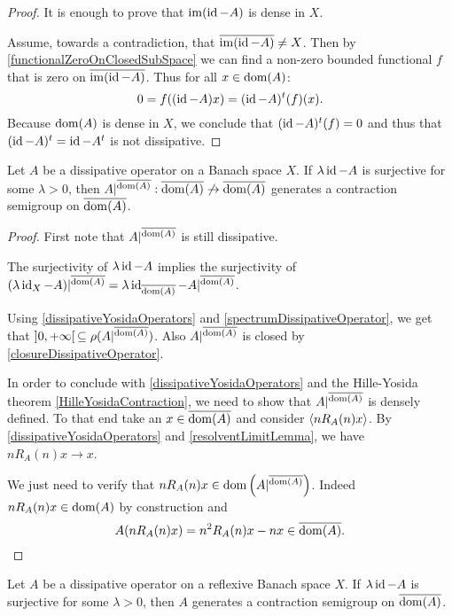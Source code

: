 \begin{proof}
It is enough to prove that $\operatorname{im}(\operatorname{id} - A)$ is dense in $X$.

Assume, towards a contradiction, that $\overline{\operatorname{im}(\operatorname{id} - A)} \neq X$. Then by \ref{functionalZeroOnClosedSubSpace} we can find a non-zero bounded functional $f$ that is zero on $\overline{\operatorname{im}(\operatorname{id} - A)}$. Thus for all $x\in \operatorname{dom}(A)$:
\[ 0 = f((\operatorname{id}- A)x) = (\operatorname{id}-A)^t(f)(x). \]
Because $\operatorname{dom}(A)$ is dense in $X$, we conclude that $(\operatorname{id}-A)^t(f) = 0$ and thus that $(\operatorname{id}-A)^t = \operatorname{id} - A^t$ is not dissipative.
\end{proof}

\begin{proposition}
Let $A$ be a dissipative operator on a Banach space $X$. If $\lambda\operatorname{id} - A$ is surjective for some $\lambda > 0$, then $A|^{\overline{\operatorname{dom}(A)}}: \overline{\operatorname{dom}(A)}\not\to \overline{\operatorname{dom}(A)}$ generates a contraction semigroup on $\overline{\operatorname{dom}(A)}$.
\end{proposition}
\begin{proof}
First note that $A|^{\overline{\operatorname{dom}(A)}}$ is still dissipative. 

The surjectivity of $\lambda\operatorname{id} - A$ implies the surjectivity of $(\lambda\operatorname{id}_X - A)|^{\overline{\operatorname{dom}(A)}} = \lambda\operatorname{id}_{\overline{\operatorname{dom}(A)}} - A|^{\overline{\operatorname{dom}(A)}}$.

Using \ref{dissipativeYosidaOperators} and \ref{spectrumDissipativeOperator}, we get that $]0,+\infty[\,\subseteq \rho(A|^{\overline{\operatorname{dom}(A)}})$.
Also $A|^{\overline{\operatorname{dom}(A)}}$ is closed by \ref{closureDissipativeOperator}.

In order to conclude with \ref{dissipativeYosidaOperators} and the Hille-Yosida theorem \ref{HilleYosidaContraction}, we need to show that $A|^{\overline{\operatorname{dom}(A)}}$ is densely defined.
To that end take an $x\in \overline{\operatorname{dom}(A)}$ and consider $\left\langle nR_A(n)x \right\rangle$. By \ref{dissipativeYosidaOperators} and \ref{resolventLimitLemma}, we have $nR_A(n)x \to x$.

We just need to verify that $nR_A(n)x\in \operatorname{dom}\Big(A|^{\overline{\operatorname{dom}(A)}}\Big)$. Indeed $nR_A(n)x\in\operatorname{dom}(A)$ by construction and
\[ A(nR_A(n)x) = n^2R_A(n)x - nx \in \overline{\operatorname{dom}(A)}. \]
\end{proof}
\begin{corollary}
Let $A$ be a dissipative operator on a reflexive Banach space $X$. If $\lambda\operatorname{id} - A$ is surjective for some $\lambda > 0$, then $A$ generates a contraction semigroup on $\overline{\operatorname{dom}(A)}$.
\end{corollary}
